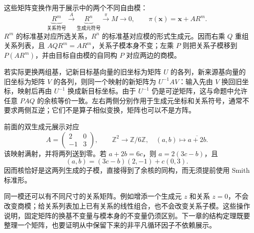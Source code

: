 这些矩阵变换作用于展示中的两个不同自由模：
\[
	\underbrace{R^m}_{\text{关系符号}} \xrightarrow{A} \underbrace{R^n}_{\text{生成元符号}} \xrightarrow{\pi}M\longrightarrow0, \qquad \pi(\mathbf x)=\mathbf x+AR^m.
\]
\(R^m\) 的标准基对应所选关系，\(R^n\) 的标准基对应模的形式生成元。因而右乘 \(Q\) 重组关系列表，且 \(AQR^m=AR^m\)，关系子模本身不变；左乘 \(P\) 则把关系子模移到 \(P(AR^m)\)，并由目标自由模的自同构 \(P\) 对应两边的商模。

\ProseParagraphBreak
若实际更换两组基，记新目标基向量的旧坐标为矩阵 \(U\) 的各列，新来源基向量的旧坐标为矩阵 \(V\) 的各列，则同一个映射的新矩阵为 \(U^{-1}AV\)：输入先由 \(V\) 换回旧坐标，映射后再由 \(U^{-1}\) 换成新目标坐标。由于 \(U^{-1}\) 仍是可逆矩阵，这与命题中允许任意 \(PAQ\) 的余核等价一致。左右两侧分别作用于生成元坐标和关系符号，通常不要求两侧互逆；它们不是算子相似变换，矩阵也可以不是方阵。

\ProseParagraphBreak
前面的双生成元展示对应
\[
	A=\begin{pmatrix}2&0\\-1&3\end{pmatrix},\qquad
	\mathbb Z^2\longrightarrow\mathbb Z/6\mathbb Z, \quad(a,b)\longmapsto\overline{a+2b}.
\]
该映射满射，并将两列送到零。若 \(a+2b=6c\)，则 \(a=2(3c-b)\)，且
\[
	(a,b)=(3c-b)(2,-1)+c(0,3).
\]
因而核恰好是这两列生成的子模，直接得到了余核的同构，而无须提前使用 Smith 标准形。

\ProseParagraphBreak
同一模还可以有不同尺寸的关系矩阵。例如增添一个生成元 \(z\) 和关系 \(z=0\)，不会改变商模；给关系列表加上已有关系的线性组合，也不会改变关系子模。这些操作说明，固定矩阵的换基不变量与模本身的不变量仍须区别。下一章的结构定理既要整理一个矩阵，也要证明从中保留下来的非平凡循环因子不依赖展示。
